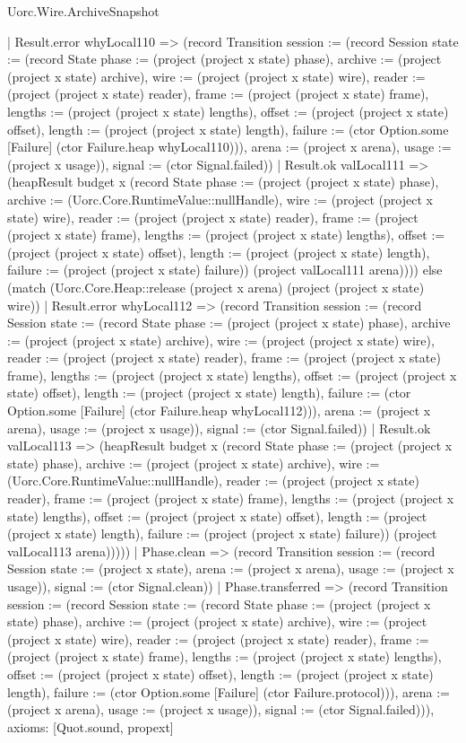 \begin{lexlean}{Uorc.Wire.ArchiveSnapshot}
\begin{semanticmodule}
{      | Result.error whyLocal110 => (record Transition {session := (record Session {state := (record State {phase := (project (project x state) phase), archive := (project (project x state) archive), wire := (project (project x state) wire), reader := (project (project x state) reader), frame := (project (project x state) frame), lengths := (project (project x state) lengths), offset := (project (project x state) offset), length := (project (project x state) length), failure := (ctor Option.some [Failure] (ctor Failure.heap whyLocal110))}), arena := (project x arena), usage := (project x usage)}), signal := (ctor Signal.failed)})
      | Result.ok valLocal111 => (heapResult budget x (record State {phase := (project (project x state) phase), archive := (Uorc.Core.RuntimeValue::nullHandle), wire := (project (project x state) wire), reader := (project (project x state) reader), frame := (project (project x state) frame), lengths := (project (project x state) lengths), offset := (project (project x state) offset), length := (project (project x state) length), failure := (project (project x state) failure)}) (project valLocal111 arena)))) else (match (Uorc.Core.Heap::release (project x arena) (project (project x state) wire))
      | Result.error whyLocal112 => (record Transition {session := (record Session {state := (record State {phase := (project (project x state) phase), archive := (project (project x state) archive), wire := (project (project x state) wire), reader := (project (project x state) reader), frame := (project (project x state) frame), lengths := (project (project x state) lengths), offset := (project (project x state) offset), length := (project (project x state) length), failure := (ctor Option.some [Failure] (ctor Failure.heap whyLocal112))}), arena := (project x arena), usage := (project x usage)}), signal := (ctor Signal.failed)})
      | Result.ok valLocal113 => (heapResult budget x (record State {phase := (project (project x state) phase), archive := (project (project x state) archive), wire := (Uorc.Core.RuntimeValue::nullHandle), reader := (project (project x state) reader), frame := (project (project x state) frame), lengths := (project (project x state) lengths), offset := (project (project x state) offset), length := (project (project x state) length), failure := (project (project x state) failure)}) (project valLocal113 arena)))))
    | Phase.clean => (record Transition {session := (record Session {state := (project x state), arena := (project x arena), usage := (project x usage)}), signal := (ctor Signal.clean)})
    | Phase.transferred => (record Transition {session := (record Session {state := (record State {phase := (project (project x state) phase), archive := (project (project x state) archive), wire := (project (project x state) wire), reader := (project (project x state) reader), frame := (project (project x state) frame), lengths := (project (project x state) lengths), offset := (project (project x state) offset), length := (project (project x state) length), failure := (ctor Option.some [Failure] (ctor Failure.protocol))}), arena := (project x arena), usage := (project x usage)}), signal := (ctor Signal.failed)})),
  axioms: [Quot.sound, propext]
}


\end{semanticmodule}
\end{lexlean}
